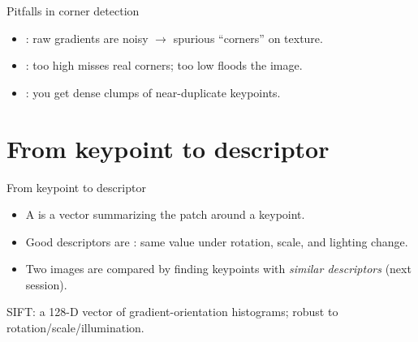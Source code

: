 \documentclass[10pt,aspectratio=169]{beamer}
\begin{document}
\begin{frame}{Pitfalls in corner detection}
  \begin{badbox}
    \begin{itemize}
      \item {}: raw gradients are noisy $\rightarrow$ spurious ``corners'' on texture.
      \item {}: too high misses real corners; too low floods the image.
      \item {}: you get dense clumps of near-duplicate keypoints.
    \end{itemize}
  \end{badbox}
\end{frame}

\section{From keypoint to descriptor}

\begin{frame}{From keypoint to descriptor}
  \begin{itemize}
    \item A  is a vector summarizing the patch around a keypoint.
    \item Good descriptors are : same value under rotation, scale, and lighting change.
    \item Two images are compared by finding keypoints with \emph{similar descriptors} (next session).
  \end{itemize}
  \begin{mathbox}
    SIFT: a 128-D vector of gradient-orientation histograms; robust to rotation/scale/illumination.
  \end{mathbox}
\end{frame}
\end{document}
